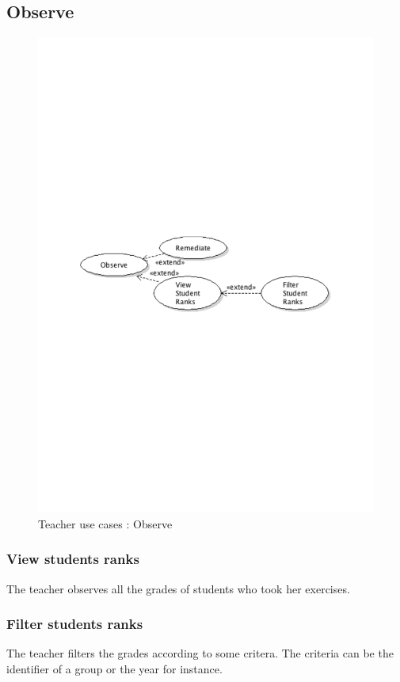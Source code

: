 	\subsection{Observe}
		\begin{figure}[ht]
			\begin{center}
				\includegraphics[width=\textwidth,  trim=2cm 12cm 2cm 12cm]{UML_figure/use_cases/teacher/UC_Teacher_Observe.pdf}
				\caption{Teacher use cases : Observe}
			\end{center}
		\end{figure}
		\subsubsection{View students ranks}
			The teacher observes all the grades of students who took her exercises.
		\subsubsection{Filter students ranks}
			The teacher filters the grades according to some critera.
			The criteria can be the identifier of a group or the year for instance.
